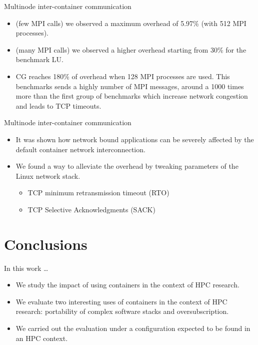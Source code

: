 \documentclass[presentation]{beamer}
\begin{document}
\begin{frame}[label=sec-3-8]{Multinode inter-container communication}
\begin{itemize}
\item (few MPI calls) we observed a maximum overhead of 5.97\% (with 512 MPI processes).
\item (many MPI calls) we observed a higher overhead starting from 30\% for the benchmark LU.

\item CG reaches 180\% of overhead when 128 MPI processes are used.
This benchmarks sends a highly number of MPI messages, around
a 1000 times more than the first group of benchmarks
which increase network congestion and leads to TCP timeouts.
\end{itemize}
\end{frame}

\begin{frame}[label=sec-3-9]{Multinode inter-container communication}
\begin{itemize}
\item It was shown how network bound applications can be severely affected by
the default container network interconnection.

\item We found a way to alleviate the overhead
by tweaking parameters of the Linux network stack.

\begin{itemize}
\item TCP minimum retransmission timeout (RTO)
\item TCP Selective Acknowledgments (SACK)
\end{itemize}
\end{itemize}
\end{frame}


\section{Conclusions}
\label{sec-4}
\begin{frame}[label=sec-4-1]{In this work \ldots{}}
\begin{itemize}
\item We study the impact of using containers in the context of HPC research.

\item We evaluate two interesting uses of containers in the context of HPC research: portability of complex software stacks
and oversubscription.

\item We carried out the evaluation under a configuration expected to be found in an HPC context.
\end{itemize}
\end{frame}
\end{document}
